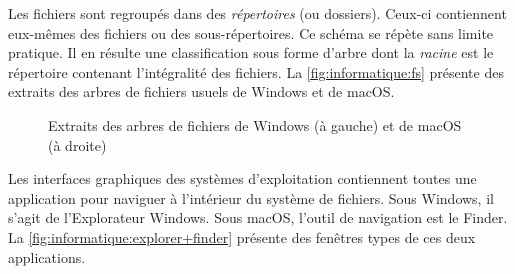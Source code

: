 Les fichiers sont regroupés dans des %
\emph{répertoires} (ou dossiers). Ceux-ci
contiennent eux-mêmes des fichiers ou des sous-répertoires. Ce schéma
se répète sans limite pratique. Il en résulte une classification sous
forme d'arbre dont la \emph{racine} est le répertoire contenant
l'intégralité des fichiers. La \autoref{fig:informatique:fs} présente
des extraits des arbres de fichiers usuels de Windows
et de macOS.

\begin{figure}
  \begin{minipage}[t]{0.45\linewidth}
  \end{minipage}
  \hfill
  \begin{minipage}[t]{0.45\linewidth}
  \end{minipage}
  \caption[Extraits de la hiérarchie des systèmes de fichiers]{%
    Extraits des arbres de fichiers de Windows (à gauche) et de
    macOS (à droite)}
  \label{fig:informatique:fs}
\end{figure}

Les interfaces graphiques des systèmes d'exploitation contiennent
toutes une application pour naviguer à l'intérieur du système de
fichiers. Sous Windows, il s'agit de %
l'Explorateur Windows. Sous
macOS, l'outil de navigation est le Finder.
La \autoref{fig:informatique:explorer+finder} présente des fenêtres
types de ces deux applications.


